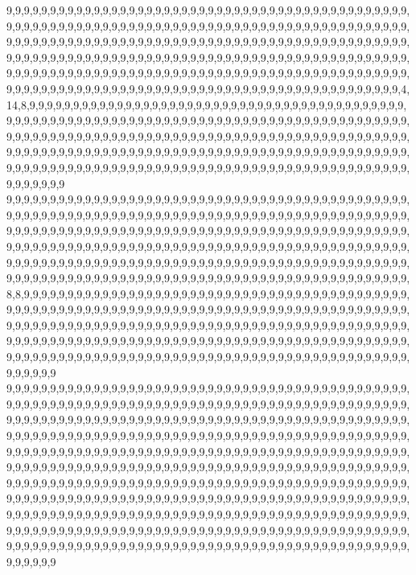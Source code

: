 9,9,9,9,9,9,9,9,9,9,9,9,9,9,9,9,9,9,9,9,9,9,9,9,9,9,9,9,9,9,9,9,9,9,9,9,9,9,9,9,9,9,9,9,9,9,9,9,9,9,9,9,9,9,9,9,9,9,9,9,9,9,9,9,9,9,9,9,9,9,9,9,9,9,9,9,9,9,9,9,9,9,9,9,9,9,9,9,9,9,9,9,9,9,9,9,9,9,9,9,9,9,9,9,9,9,9,9,9,9,9,9,9,9,9,9,9,9,9,9,9,9,9,9,9,9,9,9,9,9,9,9,9,9,9,9,9,9,9,9,9,9,9,9,9,9,9,9,9,9,9,9,9,9,9,9,9,9,9,9,9,9,9,9,9,9,9,9,9,9,9,9,9,9,9,9,9,9,9,9,9,9,9,9,9,9,9,9,9,9,9,9,9,9,9,9,9,9,9,9,9,9,9,9,9,9,9,9,9,9,9,9,9,9,9,9,9,9,9,9,9,9,9,9,9,9,9,9,9,9,9,9,9,9,9,9,9,9,9,9,9,9,9,9,9,9,9,9,9,9,9,9,9,9,9,9,9,9,9,9,9,9,9,9,9,9,9,9,9,9,9,9,9,9,9,4,14,8,9,9,9,9,9,9,9,9,9,9,9,9,9,9,9,9,9,9,9,9,9,9,9,9,9,9,9,9,9,9,9,9,9,9,9,9,9,9,9,9,9,9,9,9,9,9,9,9,9,9,9,9,9,9,9,9,9,9,9,9,9,9,9,9,9,9,9,9,9,9,9,9,9,9,9,9,9,9,9,9,9,9,9,9,9,9,9,9,9,9,9,9,9,9,9,9,9,9,9,9,9,9,9,9,9,9,9,9,9,9,9,9,9,9,9,9,9,9,9,9,9,9,9,9,9,9,9,9,9,9,9,9,9,9,9,9,9,9,9,9,9,9,9,9,9,9,9,9,9,9,9,9,9,9,9,9,9,9,9,9,9,9,9,9,9,9,9,9,9,9,9,9,9,9,9,9,9,9,9,9,9,9,9,9,9,9,9,9,9,9,9,9,9,9,9,9,9,9,9,9,9,9,9,9,9,9,9,9,9,9,9,9,9,9,9,9,9,9,9,9,9,9,9,9,9,9,9,9,9,9,9,9,9,9
9,9,9,9,9,9,9,9,9,9,9,9,9,9,9,9,9,9,9,9,9,9,9,9,9,9,9,9,9,9,9,9,9,9,9,9,9,9,9,9,9,9,9,9,9,9,9,9,9,9,9,9,9,9,9,9,9,9,9,9,9,9,9,9,9,9,9,9,9,9,9,9,9,9,9,9,9,9,9,9,9,9,9,9,9,9,9,9,9,9,9,9,9,9,9,9,9,9,9,9,9,9,9,9,9,9,9,9,9,9,9,9,9,9,9,9,9,9,9,9,9,9,9,9,9,9,9,9,9,9,9,9,9,9,9,9,9,9,9,9,9,9,9,9,9,9,9,9,9,9,9,9,9,9,9,9,9,9,9,9,9,9,9,9,9,9,9,9,9,9,9,9,9,9,9,9,9,9,9,9,9,9,9,9,9,9,9,9,9,9,9,9,9,9,9,9,9,9,9,9,9,9,9,9,9,9,9,9,9,9,9,9,9,9,9,9,9,9,9,9,9,9,9,9,9,9,9,9,9,9,9,9,9,9,9,9,9,9,9,9,9,9,9,9,9,9,9,9,9,9,9,9,9,9,9,9,9,9,9,9,9,9,9,9,9,9,9,9,9,9,9,9,9,9,9,9,8,8,9,9,9,9,9,9,9,9,9,9,9,9,9,9,9,9,9,9,9,9,9,9,9,9,9,9,9,9,9,9,9,9,9,9,9,9,9,9,9,9,9,9,9,9,9,9,9,9,9,9,9,9,9,9,9,9,9,9,9,9,9,9,9,9,9,9,9,9,9,9,9,9,9,9,9,9,9,9,9,9,9,9,9,9,9,9,9,9,9,9,9,9,9,9,9,9,9,9,9,9,9,9,9,9,9,9,9,9,9,9,9,9,9,9,9,9,9,9,9,9,9,9,9,9,9,9,9,9,9,9,9,9,9,9,9,9,9,9,9,9,9,9,9,9,9,9,9,9,9,9,9,9,9,9,9,9,9,9,9,9,9,9,9,9,9,9,9,9,9,9,9,9,9,9,9,9,9,9,9,9,9,9,9,9,9,9,9,9,9,9,9,9,9,9,9,9,9,9,9,9,9,9,9,9,9,9,9,9,9,9,9,9,9,9,9,9,9,9,9,9,9,9,9,9,9,9,9,9,9,9,9,9,9,9
9,9,9,9,9,9,9,9,9,9,9,9,9,9,9,9,9,9,9,9,9,9,9,9,9,9,9,9,9,9,9,9,9,9,9,9,9,9,9,9,9,9,9,9,9,9,9,9,9,9,9,9,9,9,9,9,9,9,9,9,9,9,9,9,9,9,9,9,9,9,9,9,9,9,9,9,9,9,9,9,9,9,9,9,9,9,9,9,9,9,9,9,9,9,9,9,9,9,9,9,9,9,9,9,9,9,9,9,9,9,9,9,9,9,9,9,9,9,9,9,9,9,9,9,9,9,9,9,9,9,9,9,9,9,9,9,9,9,9,9,9,9,9,9,9,9,9,9,9,9,9,9,9,9,9,9,9,9,9,9,9,9,9,9,9,9,9,9,9,9,9,9,9,9,9,9,9,9,9,9,9,9,9,9,9,9,9,9,9,9,9,9,9,9,9,9,9,9,9,9,9,9,9,9,9,9,9,9,9,9,9,9,9,9,9,9,9,9,9,9,9,9,9,9,9,9,9,9,9,9,9,9,9,9,9,9,9,9,9,9,9,9,9,9,9,9,9,9,9,9,9,9,9,9,9,9,9,9,9,9,9,9,9,9,9,9,9,9,9,9,9,9,9,9,9,9,9,9,9,9,9,9,9,9,9,9,9,9,9,9,9,9,9,9,9,9,9,9,9,9,9,9,9,9,9,9,9,9,9,9,9,9,9,9,9,9,9,9,9,9,9,9,9,9,9,9,9,9,9,9,9,9,9,9,9,9,9,9,9,9,9,9,9,9,9,9,9,9,9,9,9,9,9,9,9,9,9,9,9,9,9,9,9,9,9,9,9,9,9,9,9,9,9,9,9,9,9,9,9,9,9,9,9,9,9,9,9,9,9,9,9,9,9,9,9,9,9,9,9,9,9,9,9,9,9,9,9,9,9,9,9,9,9,9,9,9,9,9,9,9,9,9,9,9,9,9,9,9,9,9,9,9,9,9,9,9,9,9,9,9,9,9,9,9,9,9,9,9,9,9,9,9,9,9,9,9,9,9,9,9,9,9,9,9,9,9,9,9,9,9,9,9,9,9,9,9,9,9,9,9,9,9,9,9,9,9,9,9,9,9,9,9,9,9,9,9,9,9,9,9,9,9,9,9,9,9,9,9,9,9,9,9
